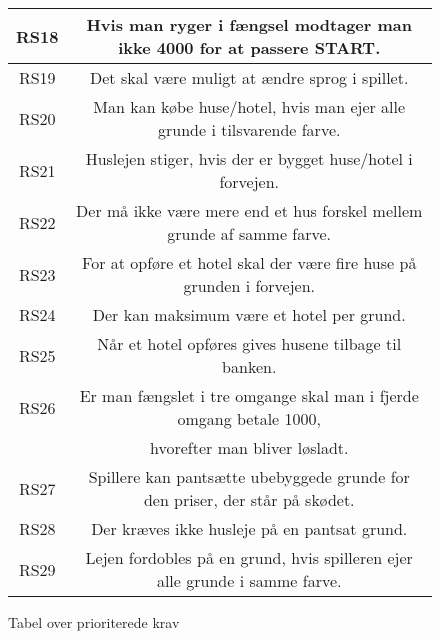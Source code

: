 \begin{figure}[H]
\begin{tabular}{ | c | c | }
\hline
RS18 & Hvis man ryger i fængsel modtager man ikke 4000 for at passere START. \\
\hline
RS19 & Det skal være muligt at ændre sprog i spillet. \\ 
\hline
RS20 & Man kan købe huse/hotel, hvis man ejer alle grunde i tilsvarende farve. \\ 
\hline
RS21 & Huslejen stiger, hvis der er bygget huse/hotel i forvejen. \\ 
\hline
RS22 & Der må ikke være mere end et hus forskel mellem grunde af samme farve. \\ 
\hline
RS23 & For at opføre et hotel skal der være fire huse på grunden i forvejen. \\ 
\hline
RS24 & Der kan maksimum være et hotel per grund.\\ 
\hline
RS25 & Når et hotel opføres gives husene tilbage til banken. \\ 
\hline
RS26 & Er man fængslet i tre omgange skal man i fjerde omgang betale 1000, \\
& hvorefter man bliver løsladt.\\
\hline
RS27 & Spillere kan pantsætte ubebyggede grunde for den priser, der står på skødet.\\
\hline
RS28 & Der kræves ikke husleje på en pantsat grund.\\
\hline
RS29 & Lejen fordobles på en grund, hvis spilleren ejer alle grunde i samme farve.\\
\hline
\end{tabular}
\caption{Tabel over prioriterede krav}
\end{figure}

